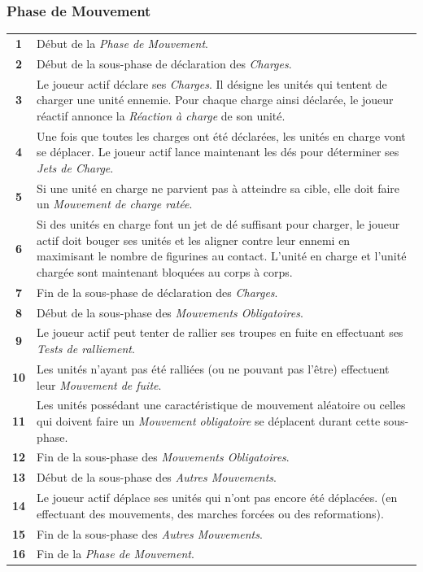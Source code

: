 \begin{table}[h!]
\begin{minipage}[t]{.35\linewidth}
\end{minipage}
\hfill
\begin{minipage}[t]{.6\linewidth}
\footnotesize

\subsubsection*{Phase de Mouvement}

\noindent
\begin{tabular}{c|m{8.4cm}}
\textbf{1} & Début de la \emph{Phase de Mouvement}. \tabularnewline
\textbf{2} & Début de la sous-phase de déclaration des \emph{Charges}. \tabularnewline
\textbf{3} & Le joueur actif déclare ses \emph{Charges}. Il désigne les unités qui tentent de charger une unité ennemie. Pour chaque charge ainsi déclarée, le joueur réactif annonce la \emph{Réaction à charge} de son unité. \tabularnewline
\textbf{4} & Une fois que toutes les charges ont été déclarées, les unités en charge vont se déplacer. Le joueur actif lance maintenant les dés pour déterminer ses \emph{Jets de Charge}.\tabularnewline
\textbf{5} & Si une unité en charge ne parvient pas à atteindre sa cible, elle doit faire un \emph{Mouvement de charge ratée}.\tabularnewline
\textbf{6} & Si des unités en charge font un jet de dé suffisant pour charger, le joueur actif doit bouger ses unités et les aligner contre leur ennemi en maximisant le nombre de figurines au contact. L'unité en charge et l'unité chargée sont maintenant bloquées au corps à corps.\tabularnewline
\textbf{7} & Fin de la sous-phase de déclaration des \emph{Charges}. \tabularnewline
\textbf{8} & Début de la sous-phase des \emph{Mouvements Obligatoires}. \tabularnewline
\textbf{9} & Le joueur actif peut tenter de rallier ses troupes en fuite en effectuant ses \emph{Tests de ralliement}. \tabularnewline
\textbf{10} & Les unités n'ayant pas été ralliées (ou ne pouvant pas l'être) effectuent leur \emph{Mouvement de fuite}. \tabularnewline
\textbf{11} & Les unités possédant une caractéristique de mouvement aléatoire ou celles qui doivent faire un \emph{Mouvement obligatoire} se déplacent durant cette sous-phase. \tabularnewline
\textbf{12} & Fin de la sous-phase des \emph{Mouvements Obligatoires}. \tabularnewline
\textbf{13} & Début de la sous-phase des \emph{Autres Mouvements}. \tabularnewline
\textbf{14} & Le joueur actif déplace ses unités qui n'ont pas encore été déplacées.  (en effectuant des mouvements, des marches forcées ou des reformations). \tabularnewline
\textbf{15} & Fin de la sous-phase des \emph{Autres Mouvements}. \tabularnewline
\textbf{16} & Fin de la \emph{Phase de Mouvement}. \tabularnewline
\end{tabular}


\end{minipage}
\end{table}
